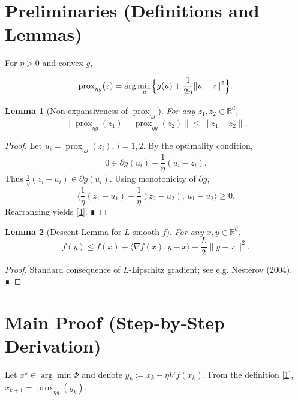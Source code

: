 \documentclass{article}
\newtheorem{lemma}{Lemma}
\begin{document}
\section*{Preliminaries (Definitions and Lemmas)}

\begin{definition}\label{def:prox}
For $\eta>0$ and convex $g$,  

\[
\operatorname{prox}_{\eta g}(z)=\arg\min_{u}\Bigl\{g(u)+\frac{1}{2\eta}\|u-z\|^2\Bigr\}.
\]
\end{definition}

\begin{lemma}[Non‑expansiveness of $\operatorname{prox}_{\eta g}$]\label{lem:nonexpansive}
For any $z_1,z_2\in\mathbb{R}^d$,
\[
\bigl\|\operatorname{prox}_{\eta g}(z_1)-\operatorname{prox}_{\eta g}(z_2)\bigr\|
\le\|z_1-z_2\|.
\tag{4}
\]
\end{lemma}
\begin{proof}
Let $u_i=\operatorname{prox}_{\eta g}(z_i)$, $i=1,2$. By the optimality condition,
\[
0\in\partial g(u_i)+\frac{1}{\eta}(u_i-z_i).
\]
Thus $\frac{1}{\eta}(z_i-u_i)\in\partial g(u_i)$. Using monotonicity of $\partial g$,
\[
\big\langle \frac{1}{\eta}(z_1-u_1)-\frac{1}{\eta}(z_2-u_2),\,u_1-u_2\big\rangle\ge0.
\]
Rearranging yields \eqref{4}. ∎
\end{proof}

\begin{lemma}[Descent Lemma for $L$‑smooth $f$]\label{lem:descent}
For any $x,y\in\mathbb{R}^d$,
\[
f(y)\le f(x)+\langle\nabla f(x),y-x\rangle+\frac{L}{2}\|y-x\|^2.
\tag{5}
\]
\end{lemma}
\begin{proof}
Standard consequence of $L$‑Lipschitz gradient; see e.g. Nesterov (2004). ∎
\end{proof}

\section*{Main Proof (Step‑by‑Step Derivation)}

Let $x^\star\in\arg\min\Phi$ and denote $y_k:=x_k-\eta\nabla f(x_k)$.  
From the definition \eqref{1}, $x_{k+1}= \operatorname{prox}_{\eta g}(y_k)$.  
\end{document}

